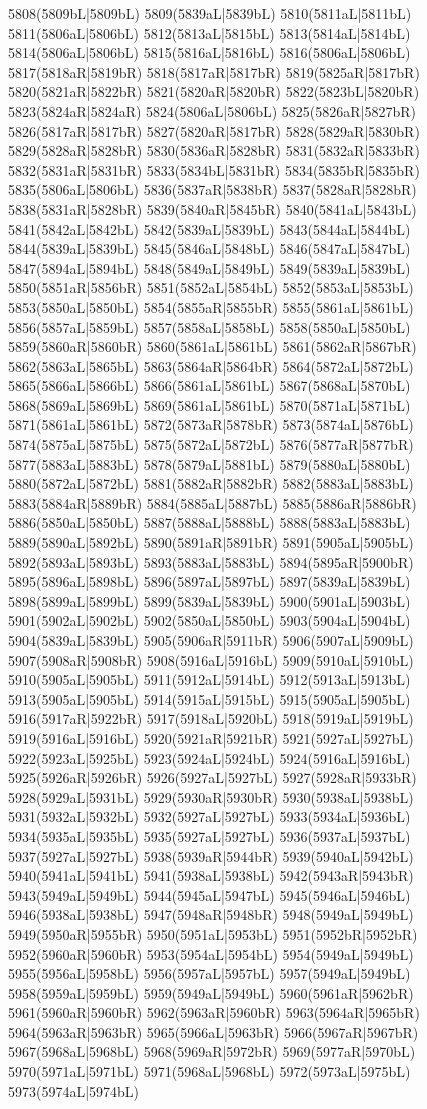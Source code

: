 5808(5809bL|5809bL) 5809(5839aL|5839bL) 5810(5811aL|5811bL) 5811(5806aL|5806bL) 5812(5813aL|5815bL) 5813(5814aL|5814bL) 5814(5806aL|5806bL) 5815(5816aL|5816bL) 5816(5806aL|5806bL) 5817(5818aR|5819bR) 5818(5817aR|5817bR) 5819(5825aR|5817bR) 5820(5821aR|5822bR) 5821(5820aR|5820bR) 5822(5823bL|5820bR) 5823(5824aR|5824aR) 5824(5806aL|5806bL) 5825(5826aR|5827bR) 5826(5817aR|5817bR) 5827(5820aR|5817bR) 5828(5829aR|5830bR) 5829(5828aR|5828bR) 5830(5836aR|5828bR) 5831(5832aR|5833bR) 5832(5831aR|5831bR) 5833(5834bL|5831bR) 5834(5835bR|5835bR) 5835(5806aL|5806bL) 5836(5837aR|5838bR) 5837(5828aR|5828bR) 5838(5831aR|5828bR) 5839(5840aR|5845bR) 5840(5841aL|5843bL) 5841(5842aL|5842bL) 5842(5839aL|5839bL) 5843(5844aL|5844bL) 5844(5839aL|5839bL) 5845(5846aL|5848bL) 5846(5847aL|5847bL) 5847(5894aL|5894bL) 5848(5849aL|5849bL) 5849(5839aL|5839bL) 5850(5851aR|5856bR) 5851(5852aL|5854bL) 5852(5853aL|5853bL) 5853(5850aL|5850bL) 5854(5855aR|5855bR) 5855(5861aL|5861bL) 5856(5857aL|5859bL) 5857(5858aL|5858bL) 5858(5850aL|5850bL) 5859(5860aR|5860bR) 5860(5861aL|5861bL) 5861(5862aR|5867bR) 5862(5863aL|5865bL) 5863(5864aR|5864bR) 5864(5872aL|5872bL) 5865(5866aL|5866bL) 5866(5861aL|5861bL) 5867(5868aL|5870bL) 5868(5869aL|5869bL) 5869(5861aL|5861bL) 5870(5871aL|5871bL) 5871(5861aL|5861bL) 5872(5873aR|5878bR) 5873(5874aL|5876bL) 5874(5875aL|5875bL) 5875(5872aL|5872bL) 5876(5877aR|5877bR) 5877(5883aL|5883bL) 5878(5879aL|5881bL) 5879(5880aL|5880bL) 5880(5872aL|5872bL) 5881(5882aR|5882bR) 5882(5883aL|5883bL) 5883(5884aR|5889bR) 5884(5885aL|5887bL) 5885(5886aR|5886bR) 5886(5850aL|5850bL) 5887(5888aL|5888bL) 5888(5883aL|5883bL) 5889(5890aL|5892bL) 5890(5891aR|5891bR) 5891(5905aL|5905bL) 5892(5893aL|5893bL) 5893(5883aL|5883bL) 5894(5895aR|5900bR) 5895(5896aL|5898bL) 5896(5897aL|5897bL) 5897(5839aL|5839bL) 5898(5899aL|5899bL) 5899(5839aL|5839bL) 5900(5901aL|5903bL) 5901(5902aL|5902bL) 5902(5850aL|5850bL) 5903(5904aL|5904bL) 5904(5839aL|5839bL) 5905(5906aR|5911bR) 5906(5907aL|5909bL) 5907(5908aR|5908bR) 5908(5916aL|5916bL) 5909(5910aL|5910bL) 5910(5905aL|5905bL) 5911(5912aL|5914bL) 5912(5913aL|5913bL) 5913(5905aL|5905bL) 5914(5915aL|5915bL) 5915(5905aL|5905bL) 5916(5917aR|5922bR) 5917(5918aL|5920bL) 5918(5919aL|5919bL) 5919(5916aL|5916bL) 5920(5921aR|5921bR) 5921(5927aL|5927bL) 5922(5923aL|5925bL) 5923(5924aL|5924bL) 5924(5916aL|5916bL) 5925(5926aR|5926bR) 5926(5927aL|5927bL) 5927(5928aR|5933bR) 5928(5929aL|5931bL) 5929(5930aR|5930bR) 5930(5938aL|5938bL) 5931(5932aL|5932bL) 5932(5927aL|5927bL) 5933(5934aL|5936bL) 5934(5935aL|5935bL) 5935(5927aL|5927bL) 5936(5937aL|5937bL) 5937(5927aL|5927bL) 5938(5939aR|5944bR) 5939(5940aL|5942bL) 5940(5941aL|5941bL) 5941(5938aL|5938bL) 5942(5943aR|5943bR) 5943(5949aL|5949bL) 5944(5945aL|5947bL) 5945(5946aL|5946bL) 5946(5938aL|5938bL) 5947(5948aR|5948bR) 5948(5949aL|5949bL) 5949(5950aR|5955bR) 5950(5951aL|5953bL) 5951(5952bR|5952bR) 5952(5960aR|5960bR) 5953(5954aL|5954bL) 5954(5949aL|5949bL) 5955(5956aL|5958bL) 5956(5957aL|5957bL) 5957(5949aL|5949bL) 5958(5959aL|5959bL) 5959(5949aL|5949bL) 5960(5961aR|5962bR) 5961(5960aR|5960bR) 5962(5963aR|5960bR) 5963(5964aR|5965bR) 5964(5963aR|5963bR) 5965(5966aL|5963bR) 5966(5967aR|5967bR) 5967(5968aL|5968bL) 5968(5969aR|5972bR) 5969(5977aR|5970bL) 5970(5971aL|5971bL) 5971(5968aL|5968bL) 5972(5973aL|5975bL) 5973(5974aL|5974bL) 